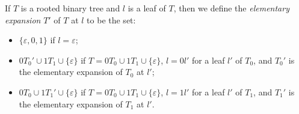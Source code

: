 \begin{definition}\label{def:tree_elementary_expansions}
    If \(T\) is a rooted binary tree and \(l\) is a leaf of \(T\), then we define the \emph{elementary expansion} \(T'\) of \(T\) at \(l\) to be the set:
    \begin{itemize}
        \item \(\{\varepsilon,0,1\}\) if \(l=\varepsilon\);
        \item \(0T_0'\cup 1 T_1 \cup \{\varepsilon\}\) if \(T=0T_0 \cup 1T_1 \cup \{\varepsilon\}\), \(l=0l'\) for a leaf \(l'\) of \(T_0\), and \(T_0'\) is the elementary expansion of \(T_0\) at \(l'\);
  \item \(0T_0\cup 1 T_1' \cup \{\varepsilon\}\) if \(T=0T_0 \cup 1T_1 \cup \{\varepsilon\}\), \(l=1l'\) for a leaf \(l'\) of \(T_1\), and \(T_1'\) is the elementary expansion of \(T_1\) at \(l'\).
    \end{itemize}
\end{definition}

